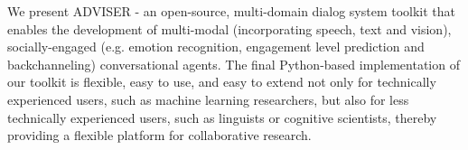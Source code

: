 We present ADVISER - an open-source, multi-domain dialog system toolkit that enables the development of multi-modal (incorporating speech, text and vision), socially-engaged (e.g. emotion recognition, engagement level prediction and backchanneling) conversational agents. The final Python-based implementation of our toolkit is flexible, easy to use, and easy to extend not only for technically experienced users, such as machine learning researchers, but also for less technically experienced users, such as linguists or cognitive scientists, thereby providing a flexible platform for collaborative research.
